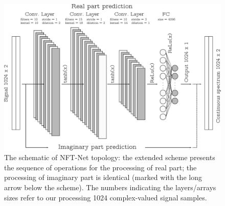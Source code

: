 \begin{figure}[tbp]
    \centering
    \includegraphics[width=1.0\linewidth]{images/nn_nft/arch_new.pdf}
    \caption{The schematic of NFT-Net topology: the extended scheme presents the sequence of operations for the processing of real part; the processing of imaginary part is identical (marked with the long arrow below the scheme). The numbers indicating the layers/arrays sizes refer to our processing 1024 complex-valued signal samples.}
    \label{fig:nn_architecture}
\end{figure}


